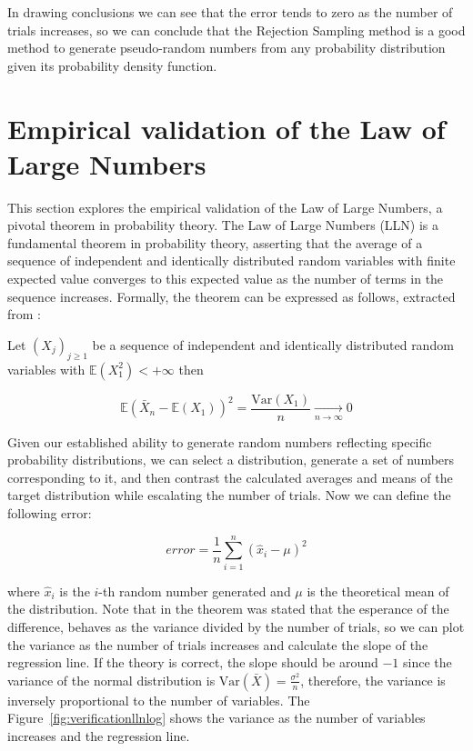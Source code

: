 \documentclass{report}
\begin{document}
In drawing conclusions we can see that the error tends to zero as the number of trials increases, so we can conclude that the Rejection Sampling method is a good method to generate pseudo-random numbers from any probability distribution given its probability density function.

\section{Empirical validation of the Law of Large Numbers}
\label{sec:lln}

This section explores the empirical validation of the Law of Large Numbers, a pivotal theorem in probability theory. The Law of Large Numbers (LLN) is a fundamental theorem in probability theory, asserting that the average of a sequence of independent and identically distributed random variables with finite expected value converges to this expected value as the number of terms in the sequence increases. Formally, the theorem can be expressed as follows, extracted from \cite{jourdain2016probabilites}:

\begin{theorem}
	Let $(X_j)_{j \geq 1}$ be a sequence of independent and identically distributed random variables with $\mathbb{E}(X_1^2) < + \infty$ then

	\begin{equation}
		\mathbb{E}(\bar{X}_n - \mathbb{E}(X_1))^2 = \frac{\mathrm{Var}(X_1)}{n} \xrightarrow[n \to \infty]{} 0
	\end{equation}
\end{theorem}

Given our established ability to generate random numbers reflecting specific probability distributions, we can select a distribution, generate a set of numbers corresponding to it, and then contrast the calculated averages and means of the target distribution while escalating the number of trials. Now we can define the following error:

\begin{equation} 
	error = \frac{1}{n}\sum_{i=1}^{n} (\hat{x}_i - \mu)^2
\end{equation}

where \(\hat{x}_i\) is the \(i\)-th random number generated and \(\mu\) is the theoretical mean of the distribution. Note that in the theorem was stated that the esperance of the difference, behaves as the variance divided by the number of trials, so we can plot the variance as the number of trials increases and calculate the slope of the regression line. If the theory is correct, the slope should be around \(-1\) since the variance of the normal distribution is \(\mathrm{Var}(\bar{X}) = \frac{\sigma^2}{n}\), therefore, the variance is inversely proportional to the number of variables. The Figure~\ref{fig:verificationllnlog} shows the variance as the number of variables increases and the regression line.
\end{document}
